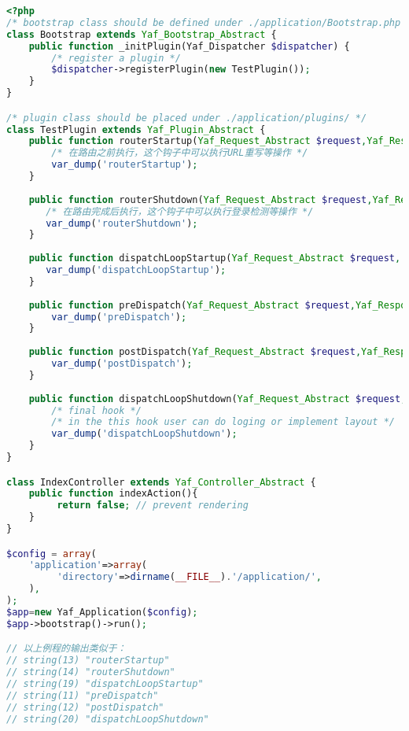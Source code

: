 \begin{lstlisting}[language=PHP]
<?php
/* bootstrap class should be defined under ./application/Bootstrap.php */
class Bootstrap extends Yaf_Bootstrap_Abstract {
    public function _initPlugin(Yaf_Dispatcher $dispatcher) {
        /* register a plugin */
        $dispatcher->registerPlugin(new TestPlugin());
    }
}

/* plugin class should be placed under ./application/plugins/ */
class TestPlugin extends Yaf_Plugin_Abstract {
    public function routerStartup(Yaf_Request_Abstract $request,Yaf_Response_Abstract $response) {
        /* 在路由之前执行，这个钩子中可以执行URL重写等操作 */
        var_dump('routerStartup');
    }
    
    public function routerShutdown(Yaf_Request_Abstract $request,Yaf_Response_Abstract $response) {
       /* 在路由完成后执行，这个钩子中可以执行登录检测等操作 */
       var_dump('routerShutdown');
    }
    
    public function dispatchLoopStartup(Yaf_Request_Abstract $request, Yaf_Response_Abstract $response) {
       var_dump('dispatchLoopStartup');
    }
    
    public function preDispatch(Yaf_Request_Abstract $request,Yaf_Response_Abstract $response) {
        var_dump('preDispatch');
    }
    
    public function postDispatch(Yaf_Request_Abstract $request,Yaf_Response_Abstract $response){
        var_dump('postDispatch');
    }
    
    public function dispatchLoopShutdown(Yaf_Request_Abstract $request,Yaf_Response_Abstract $response){
        /* final hook */
        /* in the this hook user can do loging or implement layout */
        var_dump('dispatchLoopShutdown');
    }
}

class IndexController extends Yaf_Controller_Abstract {
    public function indexAction(){
         return false; // prevent rendering
    }
}

$config = array(
    'application'=>array(
         'directory'=>dirname(__FILE__).'/application/',
    ),
);
$app=new Yaf_Application($config);
$app->bootstrap()->run();

// 以上例程的输出类似于：
// string(13) "routerStartup"
// string(14) "routerShutdown"
// string(19) "dispatchLoopStartup"
// string(11) "preDispatch"
// string(12) "postDispatch"
// string(20) "dispatchLoopShutdown"
\end{lstlisting}



